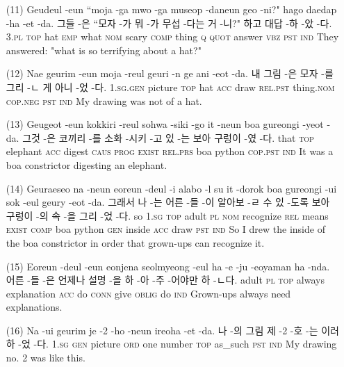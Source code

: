 \begin{itemize}
\item [(11)]
\tgl
		{Geudeul -eun ``moja -ga mwo -ga museop -daneun geo -ni?" hago daedap -ha -et -da.}
		{그들 -은 ``모자 -가 뭐 -가 무섭 -다는 거 -니?" 하고 대답 -하 -았 -다.}
		{\textsc{3.pl} \textsc{top} hat \textsc{emp} what \textsc{nom} scary \textsc{comp} thing \textsc{q} \textsc{quot} answer \textsc{vbz} \textsc{pst} \textsc{ind}}
		{They answered: "what is so terrifying about a hat?"}

\item [(12)]
\tgl
		{Nae geurim -eun moja -reul geuri -n ge ani -eot -da.}
		{내 그림 -은 모자 -를 그리 -ㄴ 게 아니 -었 -다.}
		{\textsc{1.sg.gen} picture \textsc{top} hat \textsc{acc} draw \textsc{rel.pst} thing.\textsc{nom} \textsc{cop.neg} \textsc{pst} \textsc{ind}}
		{My drawing was not of a hat.}

\item [(13)]
\tgl
		{Geugeot -eun kokkiri -reul sohwa -siki -go it -neun boa gureongi -yeot -da.}
		{그것 -은 코끼리 -를 소화 -시키 -고 있 -는 보아 구렁이 -였 -다.}
		{that \textsc{top} elephant \textsc{acc} digest \textsc{caus} \textsc{prog} \textsc{exist} \textsc{rel.prs} boa python \textsc{cop.pst} \textsc{ind}}
		{It was a boa constrictor digesting an elephant.}

\item [(14)]
\tgl
		{Geuraeseo na -neun eoreun -deul -i alabo -l su it -dorok boa gureongi -ui sok -eul geury -eot -da.}
		{그래서 나 -는 어른 -들 -이 알아보 -ㄹ 수 있 -도록 보아 구렁이 -의 속 -을 그리 -었 -다.}
		{so \textsc{1.sg} \textsc{top} adult \textsc{pl} \textsc{nom} recognize \textsc{rel} means \textsc{exist} \textsc{comp} boa python \textsc{gen} inside \textsc{acc} draw \textsc{pst} \textsc{ind}}
		{So I drew the inside of the boa constrictor in order that grown-ups can recognize it.}

\item [(15)]
\tgl
		{Eoreun -deul -eun eonjena seolmyeong -eul ha -e -ju -eoyaman ha -nda.}
		{어른 -들 -은 언제나 설명 -을 하 -아 -주 -어야만 하 -ㄴ다.}
		{adult \textsc{pl} \textsc{top} always explanation \textsc{acc} do \textsc{conn} give \textsc{oblig} do \textsc{ind}}
		{Grown-ups always need explanations.}

\item [(16)]
\tgl
		{Na -ui geurim je -2 -ho -neun ireoha -et -da.}
		{나 -의 그림 제 -2 -호 -는 이러하 -었 -다.}
		{\textsc{1.sg} \textsc{gen} picture \textsc{ord} one number \textsc{top} as\_such \textsc{pst} \textsc{ind}}
		{My drawing no. 2 was like this.}


\end{itemize}
